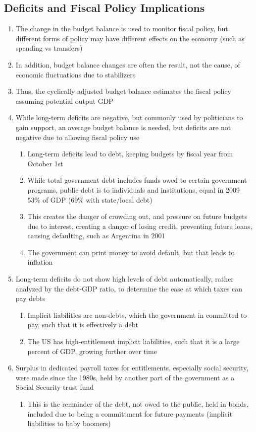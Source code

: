\documentclass[11 pt, twoside]{article}
\begin{document}
\subsection{Deficits and Fiscal Policy Implications}
\begin{enumerate}
\item The change in the budget balance is used to monitor fiscal policy, but different forms of policy may have different effects on the economy (such as spending vs transfers)
\item In addition, budget balance changes are often the result, not the cause, of economic fluctuations due to stabilizers
\item Thus, the cyclically adjusted budget balance estimates the fiscal policy assuming potential output GDP
\item While long-term deficits are negative, but commonly used by politicians to gain support, an average budget balance is needed, but deficits are not negative due to allowing fiscal policy use
\begin{enumerate}
\item Long-term deficits lead to debt, keeping budgets by fiscal year from October 1st
\item While total government debt includes funds owed to certain government programs, public debt is to individuals and institutions, equal in 2009 53\% of GDP (69\% with state/local debt)
\item This creates the danger of crowding out, and pressure on future budgets due to interest, creating a danger of losing credit, preventing future loans, causing defaulting, such as Argentina in 2001 
\item The government can print money to avoid default, but that leads to inflation
\end{enumerate}
\item Long-term deficits do not show high levels of debt automatically, rather analyzed by the debt-GDP ratio, to determine the ease at which taxes can pay debts
\begin{enumerate}
\item Implicit liabilities are non-debts, which the government in committed to pay, such that it is effectively a debt
\item The US has high-entitlement implicit liabilities, such that it is a large percent of GDP, growing further over time
\end{enumerate}
\item Surplus in dedicated payroll taxes for entitlements, especially social security, were made since the 1980s, held by another part of the government as a Social Security trust fund
\begin{enumerate}
\item This is the remainder of the debt, not owed to the public, held in bonds, included due to being a committment for future payments (implicit liabilities to baby boomers)
\end{enumerate}
\end{enumerate}
\end{document}
